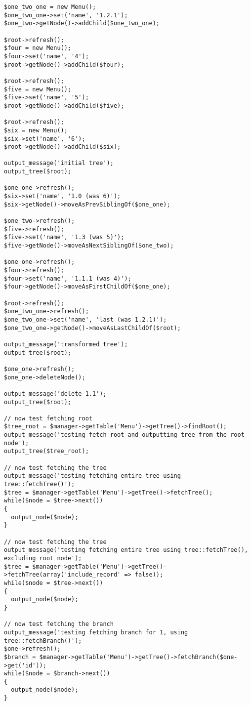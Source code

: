 \documentclass[11pt,a4paper]{report}
\begin{document}
\begin{verbatim}
$one_two_one = new Menu();
$one_two_one->set('name', '1.2.1');
$one_two->getNode()->addChild($one_two_one);

$root->refresh();
$four = new Menu();
$four->set('name', '4');
$root->getNode()->addChild($four);

$root->refresh();
$five = new Menu();
$five->set('name', '5');
$root->getNode()->addChild($five);

$root->refresh();
$six = new Menu();
$six->set('name', '6');
$root->getNode()->addChild($six);

output_message('initial tree');
output_tree($root);

$one_one->refresh();
$six->set('name', '1.0 (was 6)');
$six->getNode()->moveAsPrevSiblingOf($one_one);

$one_two->refresh();
$five->refresh();
$five->set('name', '1.3 (was 5)');
$five->getNode()->moveAsNextSiblingOf($one_two);

$one_one->refresh();
$four->refresh();
$four->set('name', '1.1.1 (was 4)');
$four->getNode()->moveAsFirstChildOf($one_one);

$root->refresh();
$one_two_one->refresh();
$one_two_one->set('name', 'last (was 1.2.1)');
$one_two_one->getNode()->moveAsLastChildOf($root);

output_message('transformed tree');
output_tree($root);

$one_one->refresh();
$one_one->deleteNode();

output_message('delete 1.1');
output_tree($root);

// now test fetching root
$tree_root = $manager->getTable('Menu')->getTree()->findRoot();
output_message('testing fetch root and outputting tree from the root node');
output_tree($tree_root);

// now test fetching the tree
output_message('testing fetching entire tree using tree::fetchTree()');
$tree = $manager->getTable('Menu')->getTree()->fetchTree();
while($node = $tree->next())
{
  output_node($node);
}

// now test fetching the tree
output_message('testing fetching entire tree using tree::fetchTree(), excluding root node');
$tree = $manager->getTable('Menu')->getTree()->fetchTree(array('include_record' => false));
while($node = $tree->next())
{
  output_node($node);
}

// now test fetching the branch
output_message('testing fetching branch for 1, using tree::fetchBranch()');
$one->refresh();
$branch = $manager->getTable('Menu')->getTree()->fetchBranch($one->get('id'));
while($node = $branch->next())
{
  output_node($node);
}


\end{verbatim}
\end{document}
